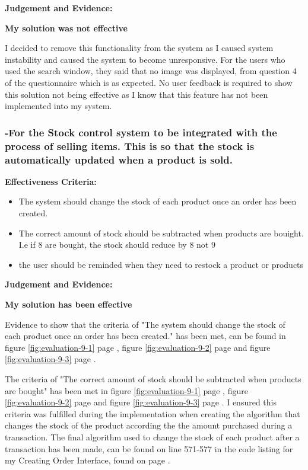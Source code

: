 \textbf{Judgement and Evidence:} \newline

\textbf{\large{My solution was not effective}}

I decided to remove this functionality from the system as I caused system instability and caused the system to become unresponsive. For the users who used the search window, they said that no image was displayed, from question 4 of the questionnaire which is as expected. No user feedback is required to show this solution not being effective as I know that this feature has not been implemented into my system.




\pagebreak
\subsubsection{-For the Stock control system to be integrated with the process of selling items. This is so that the stock is automatically updated when a product is sold.}
\label{stock-change-effectiveness}

\textbf{Effectiveness Criteria:}\newline
\begin{itemize}
	\item{The system should change the stock of each product once an order has been created.}
	\item{The correct amount of stock should be subtracted when products are bouight. I.e if 8 are bought, the stock should reduce by 8 not 9}
	\item {the user should be reminded when they need to restock a product or products}
\end{itemize}

\textbf{Judgement and Evidence:} \newline

\textbf{\large{My solution has been effective}}

Evidence to show that the criteria of "The system should change the stock of each product once an order has been created." has been met, can be found in figure \ref{fig:evaluation-9-1} page \pageref{fig:evaluation-9-1}, figure \ref{fig:evaluation-9-2} page \pageref{fig:evaluation-9-2} and figure \ref{fig:evaluation-9-3} page \pageref{fig:evaluation-9-3}. 

The criteria of "The correct amount of stock should be subtracted when products are bought" has been met in figure \ref{fig:evaluation-9-1} page \pageref{fig:evaluation-9-1}, figure \ref{fig:evaluation-9-2} page \pageref{fig:evaluation-9-2} and figure \ref{fig:evaluation-9-3} page \pageref{fig:evaluation-9-3}.  I ensured this criteria was fulfilled during the implementation when creating the algorithm that changes the stock of the product according the the amount purchased during a transaction. The final algorithm used to change the stock of each product after a transaction has been made, can be found on line 571-577 in the code listing for my Creating Order Interface, found on page \pageref{order}.

